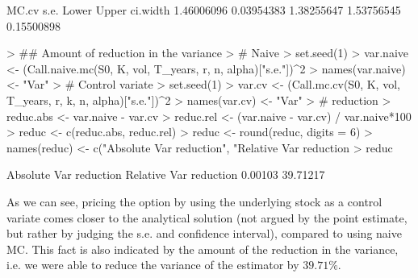 \documentclass{article}
\begin{document}
\begin{Schunk}
\begin{Soutput}
     MC.cv       s.e.      Lower      Upper   ci.width 
1.46006096 0.03954383 1.38255647 1.53756545 0.15500898 
\end{Soutput}
\begin{Sinput}
> ## Amount of reduction in the variance
> # Naive
> set.seed(1)
> var.naive <- (Call.naive.mc(S0, K, vol, T_years, r, n, alpha)["s.e."])^2
> names(var.naive) <- "Var"
> # Control variate
> set.seed(1)
> var.cv <- (Call.mc.cv(S0, K, vol, T_years, r, k, n, alpha)["s.e."])^2
> names(var.cv) <- "Var"
> # reduction
> reduc.abs <- var.naive - var.cv
> reduc.rel <- (var.naive - var.cv) / var.naive*100
> reduc <- c(reduc.abs, reduc.rel)
> reduc  <- round(reduc, digits = 6)
> names(reduc) <- c("Absolute Var reduction", "Relative Var reduction %")
> reduc
\end{Sinput}
\begin{Soutput}
  Absolute Var reduction Relative Var reduction % 
                 0.00103                 39.71217 
\end{Soutput}
\end{Schunk}
As we can see, pricing the option by using the underlying stock as a control variate comes closer to the analytical solution (not argued by the point estimate, but rather by judging the s.e. and confidence interval), compared to using naive MC. This fact is also indicated by the amount of the reduction in the variance, i.e. we were able to reduce the variance of the estimator by $39.71\%$.\\
\end{document}
